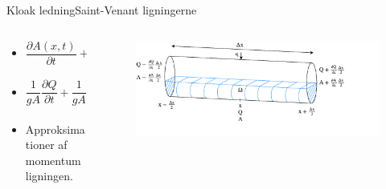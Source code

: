 \begin{frame}{Kloak ledning}{Saint-Venant ligningerne}{}
	\vfill\vfill\centering
	
\begin{columns}
		\begin{column}{0.4\textwidth}
			\begin{itemize}
				\item<1-> $\dfrac{\partial A(x,t)}{\partial t} + \dfrac{\partial Q(x,t)}{\partial x}=0$
				\vspace{9mm}
				\item<2-> $\dfrac{1}{gA} \dfrac{\partial Q}{\partial t} +\dfrac{1}{gA}\dfrac{\partial}{\partial x} \left( \dfrac{Q^2}{A} \right) +
				\dfrac{\partial h}{\partial x} + S_f - S_b = 0$
				
				\vspace{9mm}
				\item<3-> Approksimationer af momentum ligningen.
			\end{itemize}
		\end{column}
		\begin{column}{0.48\textwidth}
			\begin{figure}[H]
				\centering
				\includegraphics[width=1.2\textwidth]{Sections/pictures/continuity_open_channel.pdf}
			\end{figure}
		\end{column}
	\end{columns}
\vfill\vfill		
\end{frame}

